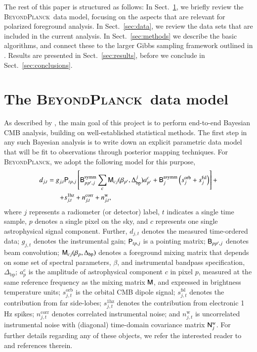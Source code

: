 \documentclass[twocolumn]{aa}
\newcommand{\B}[0]{\tens{B}}
\newcommand{\N}[0]{\tens{N}}
\newcommand{\M}[0]{\tens{M}}
\renewcommand{\P}[0]{\tens{P}}
\newcommand{\Dbp}[0]{\Delta_{\mathrm{bp}}}
\newcommand{\BP}{\textsc{BeyondPlanck}}
\newcommand{\?}[1]{\textcolor{red}{{\bf [#1]}}}
\begin{document}
The rest of this paper is structured as follows: In Sect.~\ref{sec:model}, we
briefly review the \BP\ data model, focusing on the aspects that are relevant
for polarized foreground analysis. In Sect.~\ref{sec:data}, we review the data
sets that are included in the current analysis. In Sect.~\ref{sec:methods} we
describe the basic algorithms, and connect these to the larger Gibbs sampling
framework outlined in \citet{bp01}. Results are presented in
Sect.~\ref{sec:results}, before we conclude in Sect.~\ref{sec:conclusions}.

\section{The \BP\ data model}
\label{sec:model}

As described by \citet{bp01}, the main goal of this project is to
perform end-to-end Bayesian CMB analysis, building on well-established
statistical methods. The first step in any such Bayesian analysis is
to write down an explicit parametric data model that will be
fit to observations through posterior mapping techniques. For \BP,
we adopt the following model for this purpose,
\begin{equation}
  \begin{split}
    d_{j,t} = g_{j,t}&\P_{tp,j}\left[\B^{\mathrm{symm}}_{pp',j}\sum_{c}
      \M_{cj}(\beta_{p'}, \Dbp^{j})a^c_{p'}  + \B^{\mathrm{asymm}}_{j}\left(s^{\mathrm{orb}}_{j}  
      + s^{\mathrm{fsl}}_{j}\right)\right] + \\
    + &s^{\mathrm{1hz}}_{j,t} + n^{\mathrm{corr}}_{j,t} + n^{\mathrm{w}}_{j,t},
  \end{split}
  \label{eq:todmodel}
\end{equation}
where $j$ represents a radiometer (or detector) label, $t$ indicates a
single time sample, $p$ denotes a single pixel on the sky, and $c$
represents one single astrophysical signal component. Further, 
$d_{j,t}$ denotes the measured time-ordered data; $g_{j,t}$ denotes
the instrumental gain; $\P_{tp,j}$ is a pointing matrix; $\B_{pp',j}$
denotes beam convolution; $\M_{cj}(\beta_{p}, \Dbp)$ denotes a
foreground mixing matrix that depends on some set of spectral
parameters, $\beta$, and instrumental bandpass specification, $\Dbp$;
$a^c_{p}$ is the amplitude of astrophysical component $c$ in pixel
$p$, measured at the same reference frequency as the mixing matrix
$\M$, and expressed in brightness temperature units;
$s^{\mathrm{orb}}_{j,t}$ is the orbital CMB dipole signal;
$s^{\mathrm{fsl}}_{j,t}$ denotes the contribution from far side-lobes;
$s^{\mathrm{1hz}}_{j,t}$ denotes the contribution from electronic 1\,Hz spikes;
$n^{\mathrm{corr}}_{j,t}$ denotes correlated instrumental noise; and
$n^{\mathrm{w}}_{j,t}$ is uncorrelated instrumental noise with
(diagonal) time-domain covariance matrix $\N^{\mathrm{w}}_j$. For
further details regarding any of these objects, we refer the
interested reader to \citet{bp01} and references therein.
\end{document}
